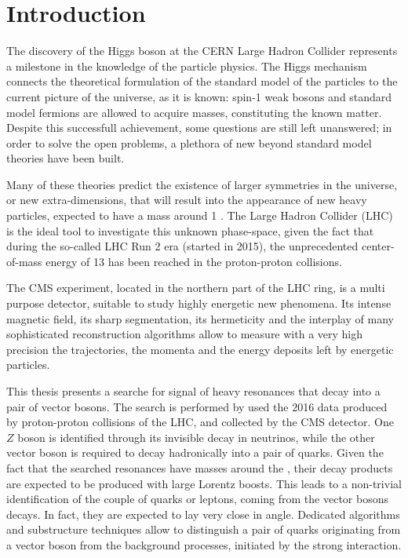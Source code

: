 \chapter{Introduction}

The discovery of the Higgs boson at the CERN Large Hadron Collider represents a milestone in the knowledge of the particle physics. The Higgs mechanism connects the theoretical formulation of the standard model of the particles to the current picture of the universe, as it is known: spin-1 weak bosons and standard model fermions are allowed to acquire masses, constituting the known matter. Despite this successfull achievement, some questions are still left unanswered; in order to solve the open problems, a plethora of new beyond standard model theories have been built.

\noindent Many of these theories predict the existence of larger symmetries in the universe, or new extra-dimensions, that will result into the appearance of new heavy particles, expected to have a mass around 1 \TeV. The Large Hadron Collider (LHC) is the ideal tool to investigate this unknown phase-space, given the fact that during the so-called LHC Run 2 era (started in 2015), the unprecedented center-of-mass energy of 13 \TeV has been reached in the proton-proton collisions.

\noindent The CMS experiment, located in the northern part of the LHC ring, is a multi purpose detector, suitable to study highly energetic new phenomena. Its intense magnetic field, its sharp segmentation, its hermeticity and the interplay of many sophisticated reconstruction algorithms allow to measure with a very high precision the trajectories, the momenta and the energy deposits left by energetic particles.

\vspace*{1\baselineskip}

\noindent This thesis presents a searche for signal of heavy resonances that decay into a pair of vector bosons. The search is performed by used the 2016 data produced by proton-proton collisions of the LHC, and collected by the CMS detector. One $Z$ boson is identified through its invisible decay in neutrinos, while the other vector boson is required to decay hadronically into a pair of quarks. Given the fact that the searched resonances have masses around the \TeV, their decay products are expected to be produced with large Lorentz boosts. This leads to a non-trivial identification of the couple of quarks or leptons, coming from the vector bosons decays. In fact, they are expected to lay very close in angle. Dedicated algorithms and substructure techniques allow to distinguish a pair of quarks originating from a vector boson from the background processes, initiated by the strong interaction.

